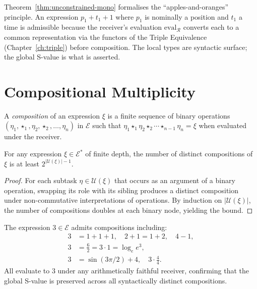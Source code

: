 \begin{remark}
Theorem~\ref{thm:unconstrained-mono} formalises the ``apples-and-oranges''
principle.  An expression $p_1 + t_1 + 1$ where $p_1$ is nominally a position
and $t_1$ a time is admissible because the receiver's evaluation
$\mathrm{eval}_{\mathcal{R}}$ converts each to a common representation via
the functors of the Triple Equivalence (Chapter~\ref{ch:triple}) before
composition.  The local types are syntactic surface; the global S-value is
what is asserted.
\end{remark}

\section{Compositional Multiplicity}
\label{sec:ch14-multiplicity}

\begin{definition}[Composition]\label{def:composition-mono}
A \emph{composition} of an expression $\xi$ is a finite sequence of binary
operations $(\eta_1, \star_1, \eta_2, \star_2, \ldots, \eta_n)$ in
$\mathcal{E}$ such that
$\eta_1 \star_1 \eta_2 \star_2 \cdots \star_{n-1} \eta_n = \xi$
when evaluated under the receiver.
\end{definition}

\begin{theorem}\label{thm:comp-mult-mono}
For any expression $\xi \in \mathcal{E}^{*}$ of finite depth, the number of
distinct compositions of $\xi$ is at least $2^{|\mathcal{U}(\xi)|-1}$.
\end{theorem}

\begin{proof}
For each subtask $\eta \in \mathcal{U}(\xi)$ that occurs as an argument of a
binary operation, swapping its role with its sibling produces a distinct
composition under non-commutative interpretations of operations.  By induction
on $|\mathcal{U}(\xi)|$, the number of compositions doubles at each binary
node, yielding the bound.
\end{proof}

\begin{example}
The expression $3 \in \mathcal{E}$ admits compositions including:
\begin{align*}
  3 &= 1 + 1 + 1, \quad 2 + 1 = 1 + 2, \quad 4 - 1,\\
  3 &= \tfrac{6}{2} = 3 \cdot 1 = \log_e e^3,\\
  3 &= \sin(3\pi/2) + 4, \quad 3\cdot\tfrac{4}{4}.
\end{align*}
All evaluate to $3$ under any arithmetically faithful receiver, confirming that
the global S-value is preserved across all syntactically distinct compositions.
\end{example}

